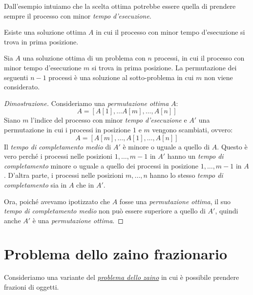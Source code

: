 \begin{note}
    Dall'esempio intuiamo che la scelta ottima potrebbe essere quella di
    prendere sempre il processo con minor \emph{tempo d'esecuzione}.
\end{note}

\begin{definition}
    Esiste una soluzione ottima $A$ in cui il processo con minor tempo
    d'esecuzione si trova in prima posizione.
\end{definition}

\begin{definition}
    Sia $A$ una soluzione ottima di un problema con $n$ processi, in cui il
    processo con minor tempo d'esecuzione $m$ si trova in prima posizione. La
    permutazione dei seguenti $n-1$ processi è una soluzione al sotto-problema
    in cui $m$ non viene considerato.
\end{definition}
\begin{proof}[Dimostrazione]
    Consideriamo una \emph{permutazione ottima} $A$:
    \[A=[A[1],\dots A[m],\dots,A[n]]\]
    Siano $m$ l'indice del processo con minor \emph{tempo d'esecuzione} e
    $A'$ una permutazione in cui i processi in posizione $1$ e $m$ vengono
    scambiati, ovvero:
    \[A=[A[m],\dots,A[1],\dots,A[n]]\]
    Il \emph{tempo di completamento medio} di $A'$ è minore o uguale a quello di
    $A$. Questo è vero perché i processi nelle posizioni $1,\dots,m-1$ in $A'$
    hanno un \emph{tempo di completamento} minore o uguale a quello dei processi
    in posizione $1,\dots,m-1$ in $A$. D'altra parte, i processi nelle posizioni
    $m,\dots,n$ hanno lo stesso \emph{tempo di completamento} sia in $A$ che in
    $A'$.

    Ora, poiché avevamo ipotizzato che $A$ fosse una \emph{permutazione ottima},
    il suo \emph{tempo di completamento medio} non può essere superiore a quello
    di $A'$, quindi anche $A'$ è una \emph{permutazione ottima}.
\end{proof}

\section{Problema dello zaino frazionario}
Consideriamo una variante del \emph{\hyperref[prob:7]{problema dello zaino}}
in cui è possibile prendere frazioni di oggetti.

